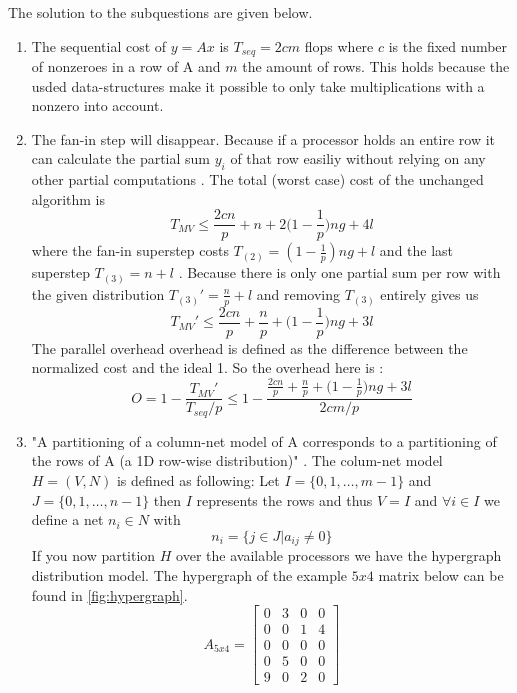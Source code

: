 \documentclass[../main.tex]{subfiles}
\begin{document}
\begin{solution} The solution to the subquestions are given below.
\begin{enumerate} 
	\item The sequential cost of $y=Ax$ is $T_{seq} = 2cm$ flops \cite[p.~166]{bisseling04} where $c$ is the fixed number of nonzeroes in a row of A and $m$ the amount of rows. This holds because the usded data-structures make it possible to only take multiplications with a nonzero into account.
	\item The fan-in step will disappear. Because if a processor holds an entire row it can calculate the partial sum $y_i$ of that row easiliy without relying on any other partial computations \cite[p.~176]{bisseling04}.  The total (worst case) cost of the unchanged algorithm is 
			$$T_{MV} \leq \frac{2cn}{p} + n + 2 \Big( 1 - \frac{1}{p} \Big) ng + 4l $$
			where the fan-in superstep costs $T_{(2)} = (1-\frac{1}{p})ng + l$ and the last superstep $T_{(3)} = n + l $ \cite[p.~178]{bisseling04}. Because there is only one partial sum per row with the given distribution $T_{(3)}' = \frac{n}{p} + l $ and removing $T_{(3)}$ entirely gives us 
			$$T_{MV}' \leq \frac{2cn}{p} + \frac{n}{p} + \Big(1 - \frac{1}{p} \Big) ng + 3l $$
			The parallel overhead overhead is defined as the difference between the normalized cost and the ideal 1. So the overhead here is \cite[p.~141]{bisseling04}:
	$$O = 1 - \frac{T_{MV}'}{T_{seq}/p} \leq 1 - \frac{\frac{2cn}{p} + \frac{n}{p} + \Big(1 - \frac{1}{p} \Big) ng + 3l}{2cm/p}$$
	\item "A partitioning of a column-net model of A corresponds to a partitioning of the rows of A (a 1D row-wise distribution)" \cite{slides6}. The colum-net model $H=(V,N)$ is defined as following: Let $I = \{0,1,\ldots,m-1\}$ and $J = \{0,1,\ldots,n-1\}$ then $I$ represents the rows and thus $V = I$ and $\forall i \in I$ we define a net $n_i \in N$ with  
		$$ n_i = \{j \in J | a_{ij} \neq 0\} $$
		If you now partition $H$ over the available processors we have the hypergraph distribution model. The hypergraph of the example $5x4$ matrix below can be found in \autoref{fig:hypergraph}.
		$$ A_{5x4} = \begin{bmatrix}
				0 & 3 & 0 & 0 \\
				0 & 0 & 1 & 4 \\
				0 & 0 & 0 & 0 \\
				0 & 5 & 0 & 0 \\
				9 & 0 & 2 & 0
		\end{bmatrix}$$
		\begin{figure}

\end{figure}
\end{enumerate}
\end{solution}
\end{document}
